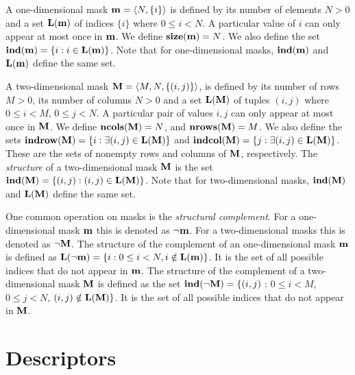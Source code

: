 A one-dimensional mask ${\bf m} = \langle N, \{ i \} \rangle$ is
defined by its number of elements $N>0$ and a set $\bold{L}({\bf m})$
of indices $\{ i \}$ where $0 \leq i < N$.  A particular value of $i$ can
only appear at most once in ${\bf m}$. We define $\bold{size}({\bf m})
= N$.  We also define the set ${\bf ind({\bf m})} = \{ i : i \in
\bold{L}({\bf m}) \}$. Note that for one-dimensional masks, 
$\bold{ind}({\bf m})$ and  $\bold{L}({\bf m})$ define the same set. 

A two-dimensional mask ${\bf M} = \langle M, N, \{ (i,j) \}
\rangle$, is defined by its number of rows $M>0$, its number of
columns $N>0$ and a set $\bold{L}({\bf M})$ of tuples $(i,j)$
where $0 \leq i < M$, $0 \leq j < N$.   A particular pair of values
$i,j$ can only appear at most once in ${\bf M}$.  We define
$\bold{ncols}({\bf M}) = N$, and $\bold{nrows}({\bf M}) = M$.
We also define the sets ${\bf indrow({\bf M})} = \{ i : \exists
(i,j) \in \bold{L}({\bf M}) \}$ and ${\bf indcol({\bf M})}
= \{ j : \exists (i,j) \in \bold{L}({\bf M}) \}$.  These are
the sets of nonempty rows and columns of ${\bf M}$, respectively.
The \emph{structure} of a two-dimensional mask ${\bf M}$ is the set
$\bold{ind}({\bf M}) = \{ (i,j) : (i,j) \in \bold{L}({\bf M}) \}$.
Note that for two-dimensional masks, $\bold{ind}({\bf M})$ and 
$\bold{L}({\bf M})$ define the same set.

One common operation on masks is the \emph{structural complement}.
For a one-dimensional mask ${\bf m}$ this is denoted as
$\neg{\bf m}$. For a two-dimensional masks this is denoted as
$\neg{\bf M}$.  The structure of the complement of an one-dimensional
mask ${\bf m}$ is defined as $\bold{L}(\neg{\bf m}) = \{i : 0
\leq i < N, i \notin \bold{L}({\bf m}) \}$.  It is the set of all
possible indices that do not appear in ${\bf m}$.  The structure
of the complement of a two-dimensional mask ${\bf M}$ is defined as the set
$\bold{ind}(\neg{\bf M}) = \{(i,j)$ : $0 \leq i < M$, $0 \leq j < N$,
$(i,j) \notin \bold{L}({\bf M}) \}$.  It is the set of all possible
indices that do not appear in ${\bf M}$.

\section{Descriptors}

